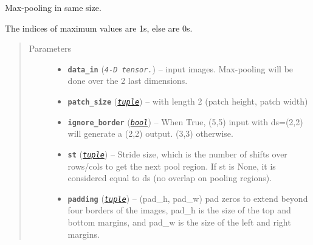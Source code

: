 \documentclass[letterpaper,10pt,english]{sphinxmanual}
\begin{document}

\begin{fulllineitems}
\label{core:core.inisim.pool_same_size}
Max-pooling in same size.

The indices of maximum values are 1s, else are 0s.
\begin{quote}\begin{description}
\item[{Parameters}] \leavevmode\begin{itemize}
\item {} 
\textbf{\texttt{data\_in}} (\emph{\texttt{4-D tensor.}}) -- input images. Max-pooling will be done over the 2 last dimensions.

\item {} 
\textbf{\texttt{patch\_size}} (\href{https://docs.python.org/library/functions.html\#tuple}{\emph{\texttt{tuple}}}) -- with length 2 (patch height, patch width)

\item {} 
\textbf{\texttt{ignore\_border}} (\href{https://docs.python.org/library/functions.html\#bool}{\emph{\texttt{bool}}}) -- When True, (5,5) input with ds=(2,2) will generate a (2,2) output.
(3,3) otherwise.

\item {} 
\textbf{\texttt{st}} (\href{https://docs.python.org/library/functions.html\#tuple}{\emph{\texttt{tuple}}}) -- Stride size, which is the number of shifts over rows/cols to get the
next pool region. If st is None, it is considered equal to ds
(no overlap on pooling regions).

\item {} 
\textbf{\texttt{padding}} (\href{https://docs.python.org/library/functions.html\#tuple}{\emph{\texttt{tuple}}}) -- (pad\_h, pad\_w) pad zeros to extend beyond four borders of the
images, pad\_h is the size of the top and bottom margins, and
pad\_w is the size of the left and right margins.

\end{itemize}

\end{description}\end{quote}

\end{fulllineitems}
\end{document}
